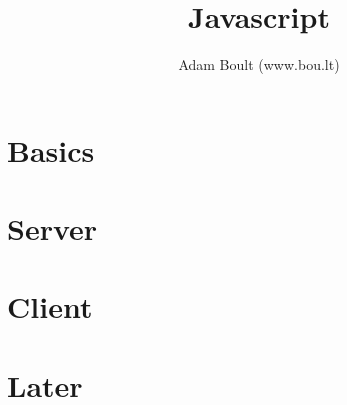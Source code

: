 \documentclass[oneside]{book}
\begin{document}
\author{Adam Boult (www.bou.lt)}
\title{Javascript}
\maketitle

\setcounter{tocdepth}{0}
\tableofcontents



\part{Basics}







\part{Server}







\part{Client}




\part{Later}


\end{document}

